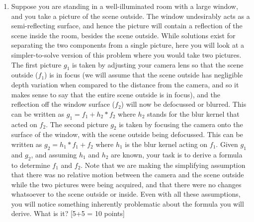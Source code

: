 \documentclass[11pt]{article}
\begin{document}
\begin{enumerate}
\item Suppose you are standing in a well-illuminated room with a large window, and you take a picture of the scene outside. The window undesirably acts as a semi-reflecting surface, and hence the picture will contain a reflection of the scene inside the room, besides the scene outside. While solutions exist for separating the two components from a single picture, here you will look at a simpler-to-solve version of this problem where you would take two pictures. The first picture $g_1$ is taken by adjusting your camera lens so that the scene outside ($f_1$) is in focus (we will assume that the scene outside has negligible depth variation when compared to the distance from the camera, and so it makes sense to say that the entire scene outside is in focus), and the reflection off the window surface ($f_2$) will now be defocussed or blurred.  This can be written as $g_1 = f_1 + h_2 * f_2$ where $h_2$ stands for the blur kernel that acted on $f_2$. The second picture $g_2$ is taken by focusing the camera onto the surface of the window, with the scene outside being defocussed. This can be written as $g_2 = h_1 * f_1 + f_2$ where $h_1$ is the blur kernel acting on $f_1$. Given $g_1$ and $g_2$, and assuming $h_1$ and $h_2$ are known, your task is to derive a formula to determine $f_1$ and $f_2$. Note that we are making the simplifying assumption that there was no relative motion between the camera and the scene outside while the two pictures were being acquired, and that there were no changes whatsoever to the scene outside or inside. Even with all these assumptions, you will notice something inherently problematic about the formula you will derive. What is it? \textsf{[5+5 = 10 points]}


\end{enumerate}
\end{document}
